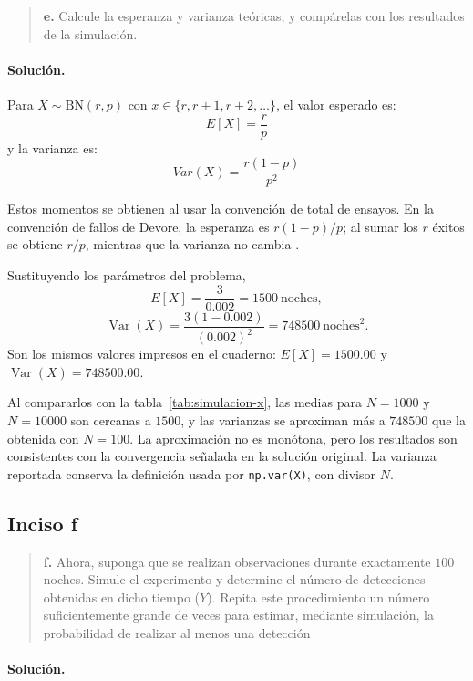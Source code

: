 \documentclass[11pt,a4paper]{article}
\newcommand{\Var}{\operatorname{Var}}
\begin{document}
\begin{quote}
\textbf{e.} Calcule la esperanza y varianza teóricas, y compárelas con los resultados de la simulación.
\end{quote}

\paragraph{Solución.}
Para $X \sim \mathrm{BN}(r, p)$ con $x \in \{r, r+1, r+2, \dots\}$, el valor esperado es:
\[
E[X] = \frac{r}{p}
\]
y la varianza es:
\[
Var(X) = \frac{r(1-p)}{p^2}
\]

Estos momentos se obtienen al usar la convención de total de ensayos. En la convención de fallos de Devore, la esperanza es $r(1-p)/p$; al sumar los $r$ éxitos se obtiene $r/p$, mientras que la varianza no cambia \citep[p.~120]{devore2008}.

Sustituyendo los parámetros del problema,
\[
    E[X]=\frac{3}{0.002}=1500\ \text{noches},
\]
\[
    \Var(X)=\frac{3(1-0.002)}{(0.002)^2}
    =748500\ \text{noches}^2.
\]
Son los mismos valores impresos en el cuaderno: $E[X]=1500.00$ y $\Var(X)=748500.00$.

Al compararlos con la tabla~\ref{tab:simulacion-x}, las medias para $N=1000$ y $N=10000$ son cercanas a $1500$, y las varianzas se aproximan más a $748500$ que la obtenida con $N=100$. La aproximación no es monótona, pero los resultados son consistentes con la convergencia señalada en la solución original. La varianza reportada conserva la definición usada por \texttt{np.var(X)}, con divisor $N$.

\subsection*{Inciso f}

\begin{quote}
\textbf{f.} Ahora, suponga que se realizan observaciones durante exactamente $100$ noches. Simule el experimento y determine el número de detecciones obtenidas en dicho tiempo ($Y$). Repita este procedimiento un número suficientemente grande de veces para estimar, mediante simulación, la probabilidad de realizar al menos una detección
\end{quote}

\paragraph{Solución.}
\end{document}
